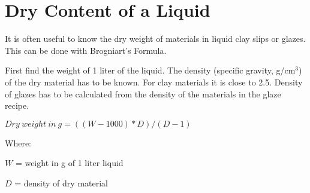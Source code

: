 \chapter{Dry Content of a Liquid}
\label{sec:drycontentofliquid}
It is often useful to know the dry weight of materials in liquid clay slips or 
glazes. This can be done with Brogniart's Formula.

First find the weight of 1 liter of the liquid. The density (specific gravity, 
g/cm$^3$) of the dry material has to be known. For clay materials it is close 
to 2.5. Density of glazes has to be calculated from the density of the
materials in the glaze recipe.

$Dry~weight~in~g=((W-1000)*D)/(D-1)$

Where:

$W$ = weight in g of 1 liter liquid

$D$ = density of dry material
